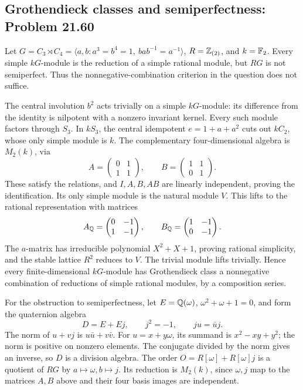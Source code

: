 \subsection{Grothendieck classes and semiperfectness: Problem 21.60}
\label{cand:21.60}

Let \(G=C_3\rtimes C_4=\langle a,b:a^3=b^4=1,\
bab^{-1}=a^{-1}\rangle\), \(R=\mathbb Z_{(2)}\), and
\(k=\mathbb F_2\). Every simple \(kG\)-module is the reduction
of a simple rational module, but \(RG\) is not
semiperfect. Thus the nonnegative-combination criterion
in the question does not suffice.

The central involution \(b^2\) acts trivially on a
simple \(kG\)-module: its difference from the identity
is nilpotent with a nonzero invariant kernel.
Every such module factors through \(S_3\). In \(kS_3\),
the central idempotent \(e=1+a+a^2\) cuts out \(kC_2\),
whose only simple module is \(k\). The complementary
four-dimensional algebra is \(M_2(k)\), via
\[
 A=\begin{pmatrix}0&1\\1&1\end{pmatrix},\qquad
 B=\begin{pmatrix}1&1\\0&1\end{pmatrix}.
\]
These satisfy the relations, and \(I,A,B,AB\) are
linearly independent, proving the identification.
Its only simple module is the natural module \(V\).
This lifts to the rational representation with matrices
\[
 A_{\mathbb Q}=\begin{pmatrix}0&-1\\1&-1\end{pmatrix},\qquad
 B_{\mathbb Q}=\begin{pmatrix}1&-1\\0&-1\end{pmatrix}.
\]
The \(a\)-matrix has irreducible polynomial
\(X^2+X+1\), proving rational simplicity, and the
stable lattice \(R^2\) reduces to \(V\).
The trivial module lifts trivially. Hence every
finite-dimensional \(kG\)-module has Grothendieck
class a nonnegative combination of reductions of
simple rational modules, by a composition series.

For the obstruction to semiperfectness, let
\(E=\mathbb Q(\omega)\), \(\omega^2+\omega+1=0\), and
form the quaternion algebra
\[
 D=E+Ej,\qquad j^2=-1,\qquad ju=\bar u j.
\]
The norm of \(u+vj\) is \(u\bar u+v\bar v\).
For \(u=x+y\omega\), its summand is
\(x^2-xy+y^2\); the norm is positive on nonzero
elements. The conjugate divided by the norm gives
an inverse, so \(D\) is a division algebra.
The order \(O=R[\omega]+R[\omega]j\) is a quotient
of \(RG\) by \(a\mapsto\omega,b\mapsto j\).
Its reduction is \(M_2(k)\), since \(\omega,j\)
map to the matrices \(A,B\) above and their four
basis images are independent.

